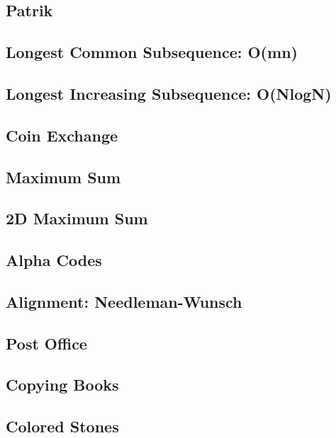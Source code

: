 \documentclass{article}
\begin{document}
    \subsection{Patrik}
        
    \subsection{Longest Common Subsequence: O(mn)}
        
    \subsection{Longest Increasing Subsequence: O(NlogN)}
        
    \subsection{Coin Exchange}
        
    \subsection{Maximum Sum}
    \subsection{2D Maximum Sum}

    \subsection{Alpha Codes}
    
    \subsection{Alignment: Needleman-Wunsch}
        
    \subsection{Post Office}
        
    \subsection{Copying Books}
        
    \subsection{Colored Stones}
\end{document}
